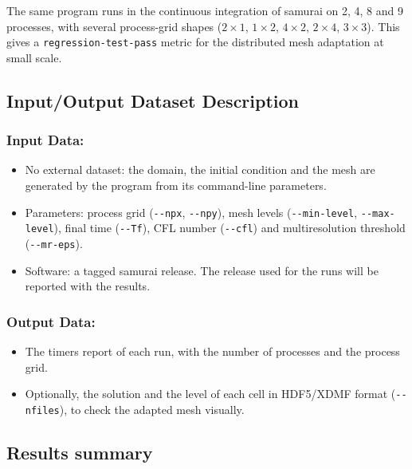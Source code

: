 The same program runs in the continuous integration of samurai on 2, 4, 8 and 9
processes, with several process-grid shapes ($2\times1$, $1\times2$, $4\times2$,
$2\times4$, $3\times3$). This gives a \texttt{regression-test-pass} metric for
the distributed mesh adaptation at small scale.




\subsection{Input/Output Dataset Description}


\subsubsection{Input Data:}
  \begin{itemize}
  \item No external dataset: the domain, the initial condition and the mesh are
    generated by the program from its command-line parameters.
  \item Parameters: process grid (\texttt{-{}-npx}, \texttt{-{}-npy}), mesh levels
    (\texttt{-{}-min-level}, \texttt{-{}-max-level}), final time (\texttt{-{}-Tf}),
    CFL number (\texttt{-{}-cfl}) and multiresolution threshold
    (\texttt{-{}-mr-eps}).
  \item Software: a tagged samurai release. The release used for the runs
    will be reported with the results.
  \end{itemize}

\subsubsection{Output Data:}
  \begin{itemize}
  \item The timers report of each run, with the number of processes and the
    process grid.
  \item Optionally, the solution and the level of each cell in HDF5/XDMF
    format (\texttt{-{}-nfiles}), to check the adapted mesh visually.
  \end{itemize}




\subsection{Results summary}

